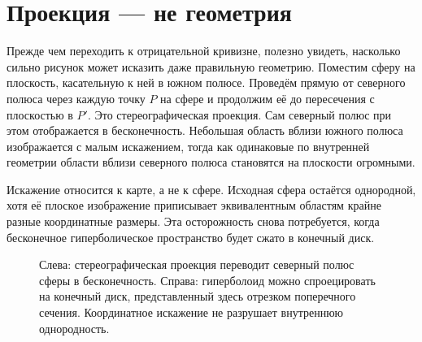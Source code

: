 \section{Проекция — не геометрия}

Прежде чем переходить к отрицательной кривизне, полезно увидеть, насколько сильно рисунок может исказить даже правильную геометрию. Поместим сферу на плоскость, касательную к ней в южном полюсе. Проведём прямую от северного полюса через каждую точку \(P\) на сфере и продолжим её до пересечения с плоскостью в \(P'\). Это стереографическая проекция. Сам северный полюс при этом отображается в бесконечность. Небольшая область вблизи южного полюса изображается с малым искажением, тогда как одинаковые по внутренней геометрии области вблизи северного полюса становятся на плоскости огромными.

Искажение относится к карте, а не к сфере. Исходная сфера остаётся однородной, хотя её плоское изображение приписывает эквивалентным областям крайне разные координатные размеры. Эта осторожность снова потребуется, когда бесконечное гиперболическое пространство будет сжато в конечный диск.

\begin{figure}[htbp]
\centering
{}%
\caption{Слева: стереографическая проекция переводит северный полюс сферы в бесконечность. Справа: гиперболоид можно спроецировать на конечный диск, представленный здесь отрезком поперечного сечения. Координатное искажение не разрушает внутреннюю однородность.}
\label{fig:c03-projections}
\end{figure}

